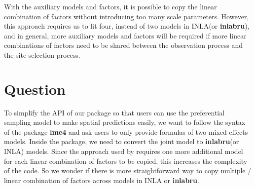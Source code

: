 With the auxiliary models and factors, it is possible to copy the linear combination of factors 
without introducing too many scale parameters. 
However, this approach requires us to fit four, instead of two models in INLA(or \textbf{inlabru}), 
and in general, more auxiliary models and factors will be required if more linear combinations 
of factors need to be shared between the observation process and the site selection process.

\section{Question}
To simplify the API of our package so that users can use the preferential sampling model to 
make spatial predictions easily, we want to follow the syntax of the package \textbf{lme4} and 
ask users to only provide formulas of two mixed effects models. Inside the package, we need to 
convert the joint model to \textbf{inlabru}(or INLA) models.  Since the approach used by 
\cite{Watson2019_pref_samp} requires one more additional model for each linear combination 
of factors to be copied, this increases the complexity of the code. So we wonder if there is more
straightforward way to copy multiple / linear combination of factors  across models in INLA or 
\textbf{inlabru}.
	
